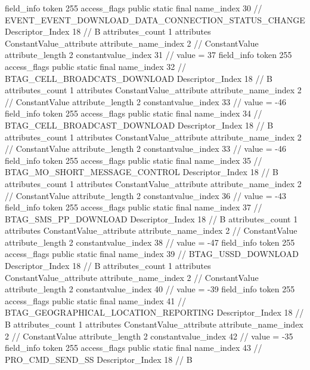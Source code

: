 {{{{{{{				}
				}
			}
			field_info {
				token	255
				access_flags	public static final
				name_index	30		// EVENT_EVENT_DOWNLOAD_DATA_CONNECTION_STATUS_CHANGE
				Descriptor_Index	18		// B
				attributes_count	1
				attributes {
				ConstantValue_attribute {
					attribute_name_index	2		// ConstantValue
					attribute_length	2
					constantvalue_index	31		// value = 37
				}
				}
			}
			field_info {
				token	255
				access_flags	public static final
				name_index	32		// BTAG_CELL_BROADCATS_DOWNLOAD
				Descriptor_Index	18		// B
				attributes_count	1
				attributes {
				ConstantValue_attribute {
					attribute_name_index	2		// ConstantValue
					attribute_length	2
					constantvalue_index	33		// value = -46
				}
				}
			}
			field_info {
				token	255
				access_flags	public static final
				name_index	34		// BTAG_CELL_BROADCAST_DOWNLOAD
				Descriptor_Index	18		// B
				attributes_count	1
				attributes {
				ConstantValue_attribute {
					attribute_name_index	2		// ConstantValue
					attribute_length	2
					constantvalue_index	33		// value = -46
				}
				}
			}
			field_info {
				token	255
				access_flags	public static final
				name_index	35		// BTAG_MO_SHORT_MESSAGE_CONTROL
				Descriptor_Index	18		// B
				attributes_count	1
				attributes {
				ConstantValue_attribute {
					attribute_name_index	2		// ConstantValue
					attribute_length	2
					constantvalue_index	36		// value = -43
				}
				}
			}
			field_info {
				token	255
				access_flags	public static final
				name_index	37		// BTAG_SMS_PP_DOWNLOAD
				Descriptor_Index	18		// B
				attributes_count	1
				attributes {
				ConstantValue_attribute {
					attribute_name_index	2		// ConstantValue
					attribute_length	2
					constantvalue_index	38		// value = -47
				}
				}
			}
			field_info {
				token	255
				access_flags	public static final
				name_index	39		// BTAG_USSD_DOWNLOAD
				Descriptor_Index	18		// B
				attributes_count	1
				attributes {
				ConstantValue_attribute {
					attribute_name_index	2		// ConstantValue
					attribute_length	2
					constantvalue_index	40		// value = -39
				}
				}
			}
			field_info {
				token	255
				access_flags	public static final
				name_index	41		// BTAG_GEOGRAPHICAL_LOCATION_REPORTING
				Descriptor_Index	18		// B
				attributes_count	1
				attributes {
				ConstantValue_attribute {
					attribute_name_index	2		// ConstantValue
					attribute_length	2
					constantvalue_index	42		// value = -35
				}
				}
			}
			field_info {
				token	255
				access_flags	public static final
				name_index	43		// PRO_CMD_SEND_SS
				Descriptor_Index	18		// B
}}}}}
